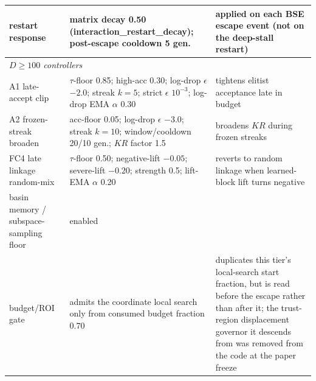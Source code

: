 \begin{table}[H]
\begin{tabular}{p{2.9cm} p{5.8cm} p{4.8cm}}
restart response & matrix decay 0.50 (interaction\_restart\_decay); post-escape cooldown 5 gen.\ & applied on each BSE escape event (not on the deep-stall restart)\\
\midrule
\multicolumn{3}{l}{\emph{$D\ge100$ controllers}}\\
\midrule
A1 late-accept clip & $\tau$-floor 0.85; high-acc 0.30; log-drop $\epsilon$ $-2.0$; streak $k{=}5$; strict $\epsilon$ $10^{-3}$; log-drop EMA $\alpha$ 0.30 & tightens elitist acceptance late in budget\\
A2 frozen-streak broaden & acc-floor 0.05; log-drop $\epsilon$ $-3.0$; streak $k{=}10$; window/cooldown 20/10 gen.; $KR$ factor 1.5 & broadens $KR$ during frozen streaks\\
FC4 late linkage random-mix & $\tau$-floor 0.50; negative-lift $-0.05$; severe-lift $-0.20$; strength 0.5; lift-EMA $\alpha$ 0.20 & reverts to random linkage when learned-block lift turns negative\\
basin memory / subspace-sampling floor & enabled & \\
budget/ROI gate & admits the coordinate local search only from consumed budget fraction $0.70$ & duplicates this tier's local-search start fraction, but is read before the escape rather than after it; the trust-region displacement governor it descends from was removed from the code at the paper freeze\\
\bottomrule
\end{tabular}
\end{table}
